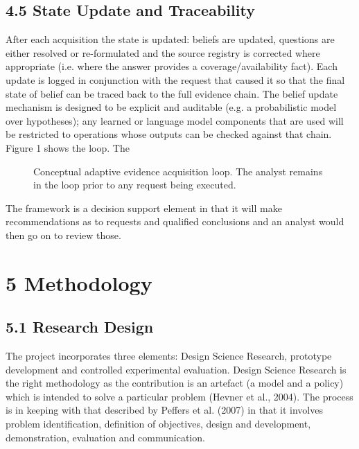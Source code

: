 \documentclass[a4paper,11pt]{article}
\begin{document}
\subsection{4.5 State Update and Traceability}
After each acquisition the state is updated: beliefs are updated, questions are either resolved or re-formulated and the source registry is corrected where appropriate (i.e. where the answer provides a coverage/availability fact). Each update is logged in conjunction with the request that caused it so that the final state of belief can be traced back to the full evidence chain. The belief update mechanism is designed to be explicit and auditable (e.g. a probabilistic model over hypotheses); any learned or language model components that are used will be restricted to operations whose outputs can be checked against that chain. Figure 1 shows the loop. The\par
\begin{figure}[htbp]\centering
{}
\caption{Conceptual adaptive evidence acquisition loop. The analyst remains in the loop prior to any request being executed.}
\end{figure}
The framework is a decision support element in that it will make recommendations as to requests and qualified conclusions and an analyst would then go on to review those.\par
\section{5 Methodology}
\subsection{5.1 Research Design}
The project incorporates three elements: Design Science Research, prototype development and controlled experimental evaluation. Design Science Research is the right methodology as the contribution is an artefact (a model and a policy) which is intended to solve a particular problem (Hevner et al., 2004). The process is in keeping with that described by Peffers et al. (2007) in that it involves problem identification, definition of objectives, design and development, demonstration, evaluation and communication.\par
\end{document}
